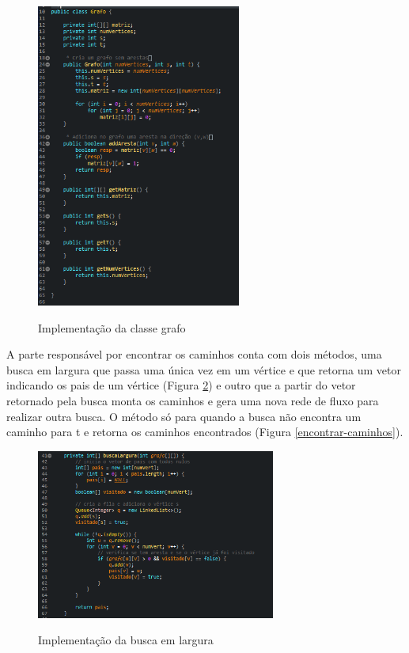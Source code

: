\begin{figure}[H]
    \centering
    \caption{Implementação da classe grafo}
    \includegraphics[width=0.6\textwidth]{figuras/grafoClass.png}
    \label{impl-grafo}
\end{figure}

A parte responsável por encontrar os caminhos conta com dois métodos, uma busca em largura que passa uma única vez em um vértice e que retorna um vetor indicando os pais de um vértice (Figura \ref{busca-largura}) e outro que a partir do vetor retornado pela busca monta os caminhos e gera uma nova rede de fluxo para realizar outra busca. O método só para quando a busca não encontra um caminho para t e retorna os caminhos encontrados (Figura \ref{encontrar-caminhos}).

\begin{figure}[H]
    \centering
    \caption{Implementação da busca em largura}
    \includegraphics[width=0.7\textwidth]{figuras/buscaLargura.png}
    \label{busca-largura}
\end{figure}

